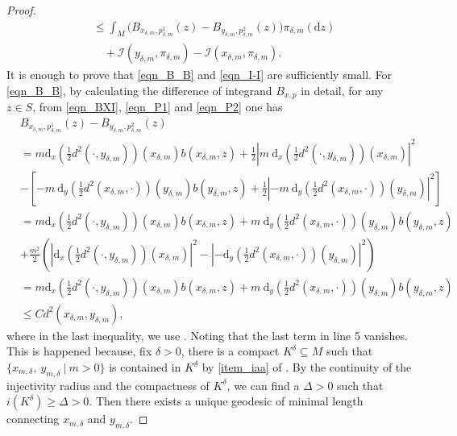 \documentclass[a4paper]{article}
\numberwithin{equation}{section}
\theoremstyle{definition}
\begin{document}
\begin{proof}
\begin{align}
	&\leq \int_M\big(B_{x_{\delta,m},p^1_{\delta,m}}(z)-B_{y_{\delta,m},p^2_{\delta,m}}(z)\big)\pi_{\delta,m}(\text{d}z)\label{eqn_B_B}\\
	&\quad+\mathcal{I}(y_{\delta,m},\pi_{\delta,m})-\mathcal{I}(x_{\delta,m},\pi_{\delta,m})\label{eqn_I-I}.
\end{align}
It is enough to prove that \eqref{eqn_B_B} and \eqref{eqn_I-I} are sufficiently small. For \eqref{eqn_B_B}, by calculating the difference of integrand  $B_{x,p}$ in detail, for any $z \in S$, from \eqref{eqn_BXI}, \eqref{eqn_P1} and \eqref{eqn_P2} one has
\begin{equation}\label{eqn:B-B}
\begin{split}
&B_{x_{\delta,m},p^1_{\delta,m}}(z)-B_{y_{\delta,m},p^2_{\delta,m}}(z)\\&
=m\mathrm{d}_{x}\left(\frac{1}{2} d^2(\cdot,y_{\delta,m})\right)(x_{\delta,m})b(x_{\delta,m},z)+\frac{1}{2}\left| m~ \mathrm{d}_{x}\left(\frac{1}{2} d^2(\cdot,y_{\delta,m})\right)(x_{\delta,m})  \right|^2\\
&-\left[ -m~\mathrm{d}_y \left(\frac{1}{2}d^2(x_{\delta,m},\cdot)\right)(y_{\delta,m})b(y_{\delta,m},z)+\frac{1}{2}\left| -m~\mathrm{d}_y \left(\frac{1}{2}d^2(x_{\delta,m},\cdot)\right)(y_{\delta,m})\right|^2 \right]\\
&=m\mathrm{d}_{x}\left(\frac{1}{2} d^2(\cdot,y_{\delta,m})\right)(x_{\delta,m})b(x_{\delta,m},z)+m~\mathrm{d}_y \left(\frac{1}{2}d^2(x_{\delta,m},\cdot)\right)(y_{\delta,m})b(y_{\delta,m},z) \\
&+\frac{m^2}{2}\left(\left|\mathrm{d}_{x}\left(\frac{1}{2} d^2(\cdot,y_{\delta,m})\right)(x_{\delta,m}) \right|^2-\left|- \mathrm{d}_y \left(\frac{1}{2}d^2(x_{\delta,m},\cdot)\right)(y_{\delta,m}) \right|^2\right)\\
&=m\mathrm{d}_{x}\left(\frac{1}{2} d^2(\cdot,y_{\delta,m})\right)(x_{\delta,m})b(x_{\delta,m},z)+m~\mathrm{d}_y \left(\frac{1}{2}d^2(x_{\delta,m},\cdot)\right)(y_{\delta,m})b(y_{\delta,m},z)\\
&
\leq Cd^2(x_{\delta,m},y_{\delta,m}),
\end{split}
\end{equation}
where in the last inequality, we use . Noting that
the last term in line 5 vanishes. This is happened because, fix $\delta>0$, there is a compact $K^\delta\subseteq M$ such that $\{x_{m,\delta},~y_{m,\delta}~|~m>0\}$ is contained in $K^\delta$ by \cref{item_iaa} of . By the continuity of the injectivity radius and the compactness of $K^\delta$, we can find a $\Delta>0$ such that $i(K^\delta)\geq \Delta >0$. Then there exists a unique geodesic of minimal length connecting $x_{m,\delta}$ and $y_{m,\delta}$. 

\end{proof}
\end{document}
